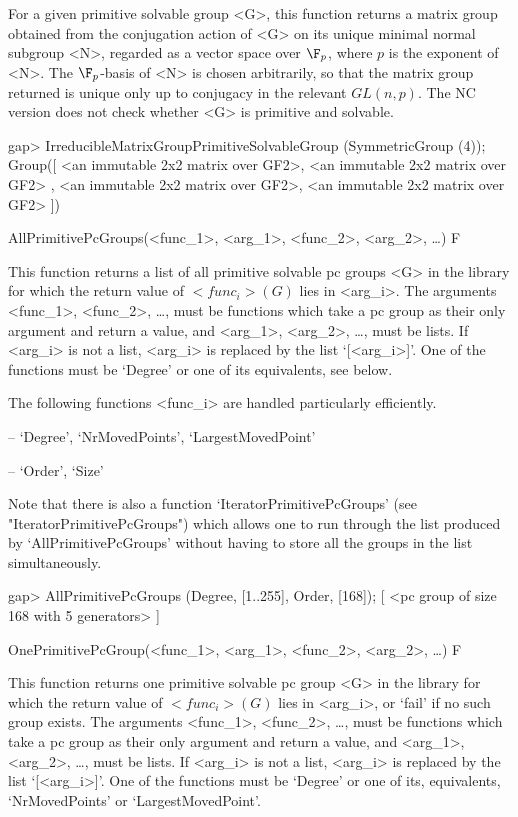 For a given primitive solvable group <G>, this function returns a matrix group 
obtained from the conjugation
action of <G> on its unique minimal normal subgroup <N>, regarded as a vector 
space over $\F_p$, where $p$ is the exponent of <N>. 
The $\F_p$-basis of <N> is chosen arbitrarily, so that the matrix group returned 
is unique only up to conjugacy in the relevant $GL(n, p)$. The NC version does
not check whether <G> is primitive and solvable.

\beginexample
gap> IrreducibleMatrixGroupPrimitiveSolvableGroup (SymmetricGroup (4));
Group([ <an immutable 2x2 matrix over GF2>, <an immutable 2x2 matrix over GF2>
    , <an immutable 2x2 matrix over GF2>, <an immutable 2x2 matrix over GF2> 
 ])
\endexample


\>AllPrimitivePcGroups(<func_1>, <arg_1>, <func_2>, <arg_2>, \dots) F

This function returns a list of all primitive solvable pc
groups <G> in the  {\IRREDSOL} library for which the return value of $<func_i>(G)$ lies
in <arg_i>.  The arguments <func_1>, <func_2>, \dots,
must be {\GAP} functions which take a pc group as their only argument and return a
value, and <arg_1>, <arg_2>,
\dots,  must be lists. If <arg_i> is not a list, <arg_i> is replaced by the list
`[<arg_i>]'. One of the functions must be `Degree' or one of its
equivalents, see below.

The following functions <func_i> are handled particularly efficiently.

\beginlist
\item{--} `Degree', `NrMovedPoints', `LargestMovedPoint'
\item{--} `Order', `Size'
\endlist

Note that there is also a function `IteratorPrimitivePcGroups' (see
"IteratorPrimitivePcGroups") which allows one to run through the list produced by
`AllPrimitivePcGroups' without having to store all the groups in the list
simultaneously.

\beginexample
gap> AllPrimitivePcGroups (Degree, [1..255], Order, [168]);
[ <pc group of size 168 with 5 generators> ]
\endexample


\>OnePrimitivePcGroup(<func_1>, <arg_1>, <func_2>, <arg_2>, \dots) F

This function returns one primitive solvable pc
group <G> in the  {\IRREDSOL} library for which the return value of $<func_i>(G)$ lies in
<arg_i>, or `fail' if no such group exists.  The arguments <func_1>, <func_2>, \dots,
must be {\GAP} functions which take a pc group as their only argument and return a
value, and <arg_1>, <arg_2>,
\dots,  must be lists. If <arg_i> is not a list, <arg_i> is replaced by the list
`[<arg_i>]'. One of the functions must be `Degree' or one of its, equivalents, `NrMovedPoints' or `LargestMovedPoint'.


